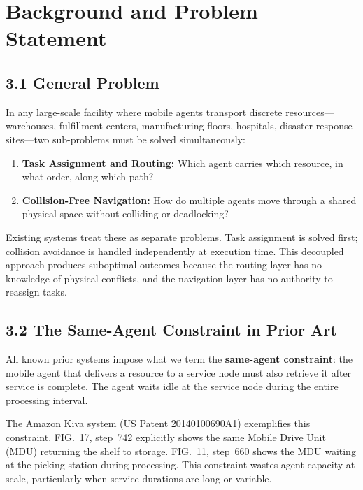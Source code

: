 \documentclass[12pt]{article}
\begin{document}
\section{Background and Problem Statement}

\subsection{3.1 \quad General Problem}

In any large-scale facility where mobile agents transport discrete resources---warehouses, fulfillment centers, manufacturing floors, hospitals, disaster response sites---two sub-problems must be solved simultaneously:

\begin{enumerate}[leftmargin=2em]
    \item \textbf{Task Assignment and Routing:} Which agent carries which resource, in what order, along which path?
    \item \textbf{Collision-Free Navigation:} How do multiple agents move through a shared physical space without colliding or deadlocking?
\end{enumerate}

Existing systems treat these as separate problems. Task assignment is solved first; collision avoidance is handled independently at execution time. This decoupled approach produces suboptimal outcomes because the routing layer has no knowledge of physical conflicts, and the navigation layer has no authority to reassign tasks.

\subsection{3.2 \quad The Same-Agent Constraint in Prior Art}

All known prior systems impose what we term the \textbf{same-agent constraint}: the mobile agent that delivers a resource to a service node must also retrieve it after service is complete. The agent waits idle at the service node during the entire processing interval.

The Amazon Kiva system (US Patent 20140100690A1) exemplifies this constraint. FIG.~17, step~742 explicitly shows the same Mobile Drive Unit (MDU) returning the shelf to storage. FIG.~11, step~660 shows the MDU waiting at the picking station during processing. This constraint wastes agent capacity at scale, particularly when service durations are long or variable.
\end{document}

